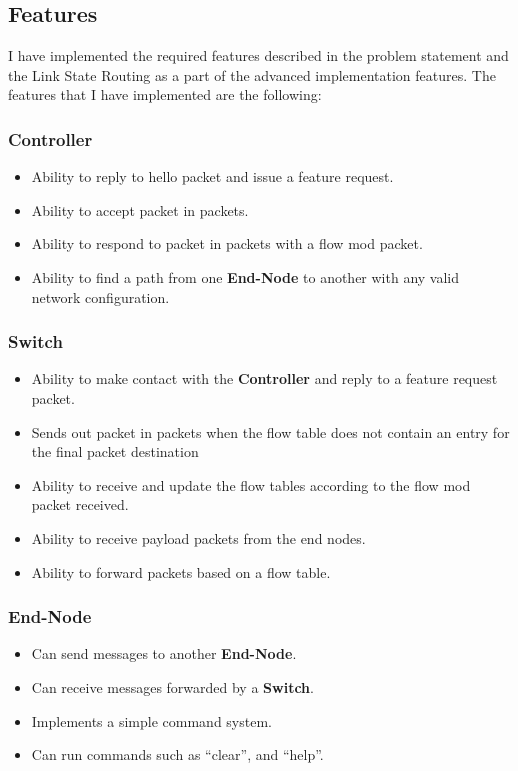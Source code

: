 \documentclass{article}
\begin{document}
\subsection{Features}
I have implemented the required features described in the problem statement and
the Link State Routing as a part of the advanced implementation features. The
features that I have implemented are the following:

\subsubsection{Controller}
\begin{itemize}
  \item{Ability to reply to hello packet and issue a feature request.}
  \item{Ability to accept packet in packets.}
  \item{Ability to respond to packet in packets with a flow mod packet.}
  \item{Ability to find a path from one \textbf{End-Node} to another with any
    valid network configuration.}
\end{itemize}

\subsubsection{Switch}
\begin{itemize}
  \item{Ability to make contact with the \textbf{Controller} and reply to a
      feature request packet.}
  \item{Sends out packet in packets when the flow table does not contain an
    entry for the final packet destination}
  \item{Ability to receive and update the flow tables according to the flow mod
    packet received.}
  \item{Ability to receive payload packets from the end nodes.}
  \item{Ability to forward packets based on a flow table.}
\end{itemize}

\subsubsection{End-Node}
\begin{itemize}
  \item{Can send messages to another \textbf{End-Node}.}
  \item{Can receive messages forwarded by a \textbf{Switch}.}
  \item{Implements a simple command system.}
  \item{Can run commands such as ``clear'', and ``help''.}
\end{itemize}
\end{document}
